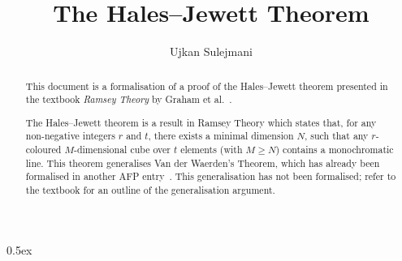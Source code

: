 \documentclass[11pt,a4paper]{article}
\begin{document}
\title{The Hales--Jewett Theorem}
\author{Ujkan Sulejmani}
\maketitle

\begin{abstract}
    This document is a formalisation of a proof of the Hales--Jewett theorem presented in the textbook \emph{Ramsey Theory} by Graham et al.~\cite{thebook}.
    
    The Hales--Jewett theorem is a result in Ramsey Theory which states that, for any non-negative integers $r$ and $t$, there exists a minimal dimension $N$, such that any $r$-coloured $M$-dimensional cube over $t$ elements (with $M \geq N$) contains a monochromatic line. This theorem generalises Van der Waerden's Theorem, which has already been formalised in another AFP entry~\cite{vdw}. This generalisation has not been formalised; refer to the textbook for an outline of the generalisation argument.
\end{abstract}


\newpage
\tableofcontents

\newpage
\parindent 0pt\parskip 0.5ex



\nocite{vdw}


\end{document}
